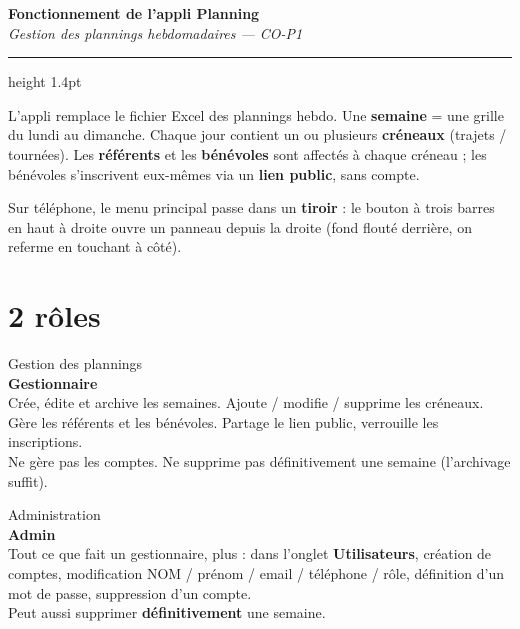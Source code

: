 \documentclass[11pt,a4paper]{article}
\begin{document}
\begin{center}
\begin{minipage}{\textwidth}
{\sffamily{}\selectfont\bfseries\huge\color{accent}Fonctionnement de l'appli Planning}\\[3pt]
{\sffamily\itshape\small\color{muted}Gestion des plannings hebdomadaires — CO-P1}
\end{minipage}
\end{center}
\vspace{2pt}
{\color{border}\hrule height 1.4pt}
\vspace{8pt}

\noindent L'appli remplace le fichier Excel des plannings hebdo. Une \textbf{semaine} = une
grille du lundi au dimanche. Chaque jour contient un ou plusieurs \textbf{créneaux} (trajets /
tournées). Les \textbf{référents} et les \textbf{bénévoles} sont affectés à chaque créneau ; les
bénévoles s'inscrivent eux-mêmes via un \textbf{lien public}, sans compte.

\vspace{4pt}
\noindent Sur téléphone, le menu principal passe dans un \textbf{tiroir} : le bouton à trois
barres en haut à droite ouvre un panneau depuis la droite (fond flouté derrière, on referme en
touchant à côté).

\section{2 rôles}

\begin{tcbraster}[raster columns=2, raster equal height=rows, raster column skip=8pt]
\begin{rolecard}
{\ttfamily\footnotesize\color{muted}Gestion des plannings}\\[6pt]
{\sffamily{}\selectfont\bfseries Gestionnaire}\\[6pt]
{\small Crée, édite et archive les semaines. Ajoute / modifie / supprime les créneaux. Gère les
référents et les bénévoles. Partage le lien public, verrouille les inscriptions.}\\[6pt]
{\small Ne gère pas les comptes. Ne supprime pas définitivement une semaine (l'archivage suffit).}
\end{rolecard}
\begin{rolecard}[colframe=accent, boxrule=1.4pt]
{\ttfamily\footnotesize\color{muted}Administration}\\[6pt]
{\sffamily{}\selectfont\bfseries Admin}\\[6pt]
{\small Tout ce que fait un gestionnaire, plus : dans l'onglet \textbf{Utilisateurs}, création de
comptes, modification NOM / prénom / email / téléphone / rôle, définition d'un mot de passe,
suppression d'un compte.}\\[6pt]
{\small Peut aussi supprimer \textbf{définitivement} une semaine.}
\end{rolecard}
\end{tcbraster}
\end{document}

